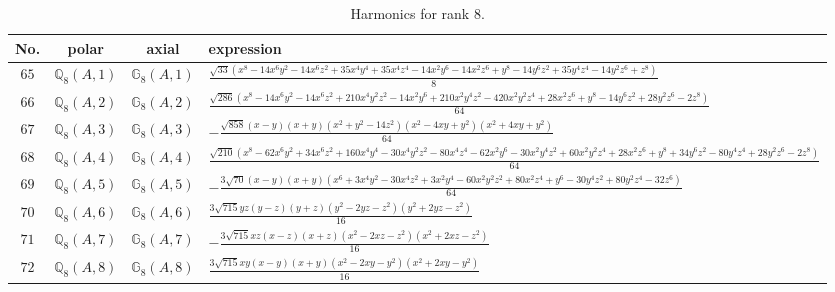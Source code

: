 \documentclass[fleqn,8pt,landscape]{jsarticle}
\begin{document}
\begin{table}[ht!]
\begin{center}
\caption{Harmonics for rank 8.}
\renewcommand{\arraystretch}{1.3}
\begin{tabular}{cccl} \hline \hline
No. & polar & axial & expression \\ \hline
$ 65 $ & $ \mathbb{Q}_{8}(A,1) $ & $ \mathbb{G}_{8}(A,1) $ & $ \frac{\sqrt{33} \left(x^{8} - 14 x^{6} y^{2} - 14 x^{6} z^{2} + 35 x^{4} y^{4} + 35 x^{4} z^{4} - 14 x^{2} y^{6} - 14 x^{2} z^{6} + y^{8} - 14 y^{6} z^{2} + 35 y^{4} z^{4} - 14 y^{2} z^{6} + z^{8}\right)}{8} $ \\
$ 66 $ & $ \mathbb{Q}_{8}(A,2) $ & $ \mathbb{G}_{8}(A,2) $ & $ \frac{\sqrt{286} \left(x^{8} - 14 x^{6} y^{2} - 14 x^{6} z^{2} + 210 x^{4} y^{2} z^{2} - 14 x^{2} y^{6} + 210 x^{2} y^{4} z^{2} - 420 x^{2} y^{2} z^{4} + 28 x^{2} z^{6} + y^{8} - 14 y^{6} z^{2} + 28 y^{2} z^{6} - 2 z^{8}\right)}{64} $ \\
$ 67 $ & $ \mathbb{Q}_{8}(A,3) $ & $ \mathbb{G}_{8}(A,3) $ & $ - \frac{\sqrt{858} \left(x - y\right) \left(x + y\right) \left(x^{2} + y^{2} - 14 z^{2}\right) \left(x^{2} - 4 x y + y^{2}\right) \left(x^{2} + 4 x y + y^{2}\right)}{64} $ \\
$ 68 $ & $ \mathbb{Q}_{8}(A,4) $ & $ \mathbb{G}_{8}(A,4) $ & $ \frac{\sqrt{210} \left(x^{8} - 62 x^{6} y^{2} + 34 x^{6} z^{2} + 160 x^{4} y^{4} - 30 x^{4} y^{2} z^{2} - 80 x^{4} z^{4} - 62 x^{2} y^{6} - 30 x^{2} y^{4} z^{2} + 60 x^{2} y^{2} z^{4} + 28 x^{2} z^{6} + y^{8} + 34 y^{6} z^{2} - 80 y^{4} z^{4} + 28 y^{2} z^{6} - 2 z^{8}\right)}{64} $ \\
$ 69 $ & $ \mathbb{Q}_{8}(A,5) $ & $ \mathbb{G}_{8}(A,5) $ & $ - \frac{3 \sqrt{70} \left(x - y\right) \left(x + y\right) \left(x^{6} + 3 x^{4} y^{2} - 30 x^{4} z^{2} + 3 x^{2} y^{4} - 60 x^{2} y^{2} z^{2} + 80 x^{2} z^{4} + y^{6} - 30 y^{4} z^{2} + 80 y^{2} z^{4} - 32 z^{6}\right)}{64} $ \\
$ 70 $ & $ \mathbb{Q}_{8}(A,6) $ & $ \mathbb{G}_{8}(A,6) $ & $ \frac{3 \sqrt{715} y z \left(y - z\right) \left(y + z\right) \left(y^{2} - 2 y z - z^{2}\right) \left(y^{2} + 2 y z - z^{2}\right)}{16} $ \\
$ 71 $ & $ \mathbb{Q}_{8}(A,7) $ & $ \mathbb{G}_{8}(A,7) $ & $ - \frac{3 \sqrt{715} x z \left(x - z\right) \left(x + z\right) \left(x^{2} - 2 x z - z^{2}\right) \left(x^{2} + 2 x z - z^{2}\right)}{16} $ \\
$ 72 $ & $ \mathbb{Q}_{8}(A,8) $ & $ \mathbb{G}_{8}(A,8) $ & $ \frac{3 \sqrt{715} x y \left(x - y\right) \left(x + y\right) \left(x^{2} - 2 x y - y^{2}\right) \left(x^{2} + 2 x y - y^{2}\right)}{16} $ \\

\end{tabular}
\end{center}
\end{table}
\end{document}
